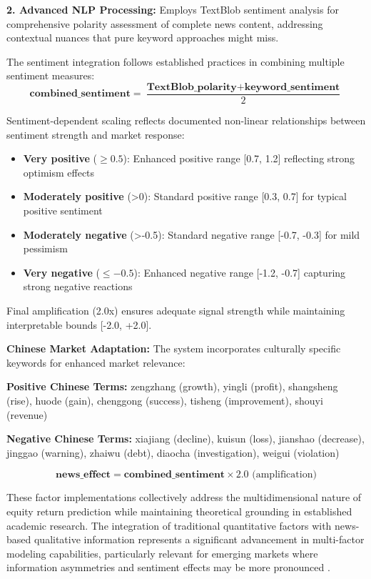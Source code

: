 \documentclass[3p,times,procedia]{elsarticle}
\begin{document}
\textbf{2. Advanced NLP Processing:} Employs TextBlob sentiment analysis for comprehensive polarity assessment of complete news content, addressing contextual nuances that pure keyword approaches might miss.

The sentiment integration follows established practices in combining multiple sentiment measures:
\begin{equation}
\textbf{combined\_sentiment} = \frac{\textbf{TextBlob\_polarity} + \textbf{keyword\_sentiment}}{2}
\end{equation}

Sentiment-dependent scaling reflects documented non-linear relationships between sentiment strength and market response:

\begin{itemize}
    \item \textbf{Very positive} ($\geq 0.5$): Enhanced positive range [0.7, 1.2] reflecting strong optimism effects
    \item \textbf{Moderately positive} (>0): Standard positive range [0.3, 0.7] for typical positive sentiment
    \item \textbf{Moderately negative} (>-0.5): Standard negative range [-0.7, -0.3] for mild pessimism
    \item \textbf{Very negative} ($\leq -0.5$): Enhanced negative range [-1.2, -0.7] capturing strong negative reactions
\end{itemize}

Final amplification (2.0x) ensures adequate signal strength while maintaining interpretable bounds [-2.0, +2.0].

\textbf{Chinese Market Adaptation:} The system incorporates culturally specific keywords for enhanced market relevance:

\textbf{Positive Chinese Terms:} zengzhang (growth), yingli (profit), shangsheng (rise), huode (gain), chenggong (success), tisheng (improvement), shouyi (revenue)

\textbf{Negative Chinese Terms:} xiajiang (decline), kuisun (loss), jianshao (decrease), jinggao (warning), zhaiwu (debt), diaocha (investigation), weigui (violation)

\begin{equation}
\textbf{news\_effect} = \textbf{combined\_sentiment} \times 2.0 \text{ (amplification)}
\end{equation}

These factor implementations collectively address the multidimensional nature of equity return prediction while maintaining theoretical grounding in established academic research. The integration of traditional quantitative factors with news-based qualitative information represents a significant advancement in multi-factor modeling capabilities, particularly relevant for emerging markets where information asymmetries and sentiment effects may be more pronounced \cite{Harvey2016}.
\end{document}
